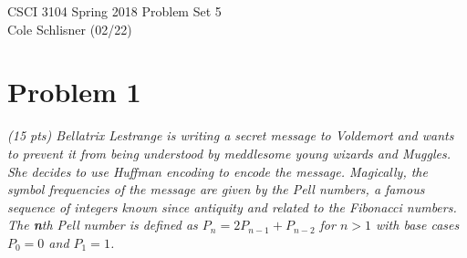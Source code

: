 \documentclass[12pt]{article} \setlength{\oddsidemargin}{0in}
\begin{document}
\noindent CSCI 3104 Spring 2018 \hfill Problem Set 5\\
Cole Schlisner (02/22)

\hrulefill

{\selectfont

  \section*{Problem 1}

  \textit{(15 pts) Bellatrix Lestrange is writing a secret message to Voldemort and wants to
prevent it from being understood by meddlesome young wizards and Muggles. She
decides to use Huffman encoding to encode the message. Magically, the symbol frequencies of the message are given by the Pell numbers, a famous sequence of integers
known since antiquity and related to the Fibonacci numbers. The \textbf{n}th Pell number is
defined as $P_n = 2 P_{n-1} + P_{n-2}$ for $n > 1$ with base cases $P_0 = 0$ and $P_1 = 1$.}

}
\end{document}
